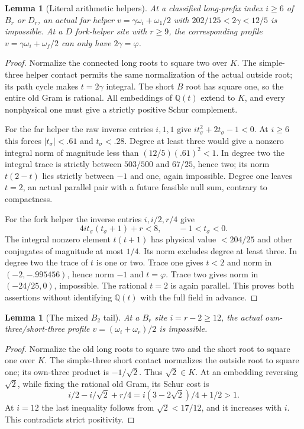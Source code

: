 \documentclass[11pt]{article}
\newtheorem{lemma}[theorem]{Lemma}
\begin{document}
\begin{lemma}[Literal arithmetic helpers]\label{lem:literal-helper}
At a classified long-prefix index $i\ge6$ of $B_r$ or $D_r$, an
actual far helper
$v=\gamma\omega_i+\omega_1/2$ with
$202/125<2\gamma<12/5$ is impossible. At a $D$ fork-helper site
with $r\ge9$, the corresponding profile
$v=\gamma\omega_i+\omega_f/2$ can only have $2\gamma=\varphi$.
\end{lemma}
\begin{proof}
Normalize the connected long roots to square two over $K$.
The simple-three helper contact permits the same normalization of
the actual outside root; its path cycle makes $t=2\gamma$ integral.
The short $B$ root has square one, so the entire old Gram is rational.
All embeddings of $\mathbb Q(t)$ extend to $K$, and every nonphysical
one must give a strictly positive Schur complement.

For the far helper the raw inverse entries $i,1,1$ give
$it_\sigma^2+2t_\sigma-1<0$.
At $i\ge6$ this forces $|t_\sigma|<.61$ and $t_\sigma<.28$.
Degree at least three would give a nonzero integral norm of magnitude
less than $(12/5)(.61)^2<1$. In degree two the integral trace is
strictly between $503/500$ and $67/25$, hence two; its norm
$t(2-t)$ lies strictly between $-1$ and one, again impossible.
Degree one leaves $t=2$, an actual parallel pair with a future feasible
null sum, contrary to compactness.

For the fork helper the inverse entries $i,i/2,r/4$ give
\[
 4it_\sigma(t_\sigma+1)+r<8,
 \qquad-1<t_\sigma<0.
\]
The integral nonzero element $t(t+1)$ has physical value $<204/25$
and other conjugates of magnitude at most $1/4$. Its norm excludes
degree at least three. In degree two the trace of $t$ is one or two.
Trace one gives $t<2$ and norm in $(-2,-.995456)$, hence norm $-1$
and $t=\varphi$. Trace two gives norm in $(-24/25,0)$, impossible.
The rational $t=2$ is again parallel. This proves both assertions
without identifying $\mathbb Q(t)$ with the full field in advance.
\end{proof}

\begin{lemma}[The mixed $B_2$ tail]\label{lem:B2seal}
At a $B_r$ site $i=r-2\ge12$, the actual own-three/short-three
profile $v=(\omega_i+\omega_r)/2$ is impossible.
\end{lemma}
\begin{proof}
Normalize the old long roots to square two and the short root to
square one over $K$. The simple-three short contact normalizes the
outside root to square one; its own-three product is $-1/\sqrt2$.
Thus $\sqrt2\in K$. At an embedding reversing $\sqrt2$, while fixing
the rational old Gram, its Schur cost is
\[
 i/2-i/\sqrt2+r/4=i(3-2\sqrt2)/4+1/2>1.
\]
At $i=12$ the last inequality follows from $\sqrt2<17/12$,
and it increases with $i$. This contradicts strict positivity.
\end{proof}
\end{document}
